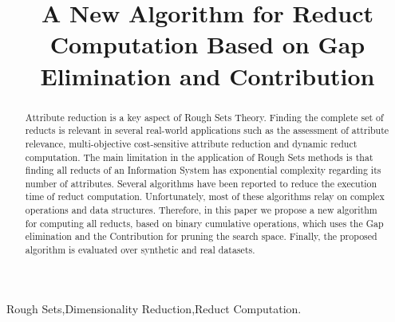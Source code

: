 \documentclass[authoryear,preprint,review,12pt]{elsarticle}
\begin{document}
	
	\title{A New Algorithm for Reduct Computation Based on Gap Elimination and Contribution}
	
	
	\address{Computer Science Department\\National Institute of
	Astrophysics, Optics and Electronics\\
	Luis Enrique Erro \# 1, Santa Mar\'{\i}a Tonantzintla, Puebla,
	72840, M\'{e}xico} 
	
	\begin{abstract}
		Attribute reduction is a key aspect of Rough Sets Theory.  Finding the complete set of reducts is relevant 
		in several real-world applications such as the assessment of attribute relevance, multi-objective cost-sensitive 
		attribute reduction and dynamic reduct computation. The main limitation in the application of
		Rough Sets methods is that finding all reducts of an Information System has exponential complexity 
		regarding its number of attributes. Several algorithms have been reported to reduce the execution time
		of reduct computation. Unfortunately, most of these algorithms relay on complex operations and data
		structures. Therefore, in this paper we propose a new algorithm for computing all reducts, based on
		binary cumulative operations, which uses the Gap elimination and the Contribution for pruning the search
		space. Finally, the proposed algorithm is evaluated over synthetic and real datasets.
	\end{abstract}
	
	\begin{keyword}
		Rough Sets\sep Dimensionality Reduction\sep Reduct Computation.
	\end{keyword}

	\maketitle

\end{document}

